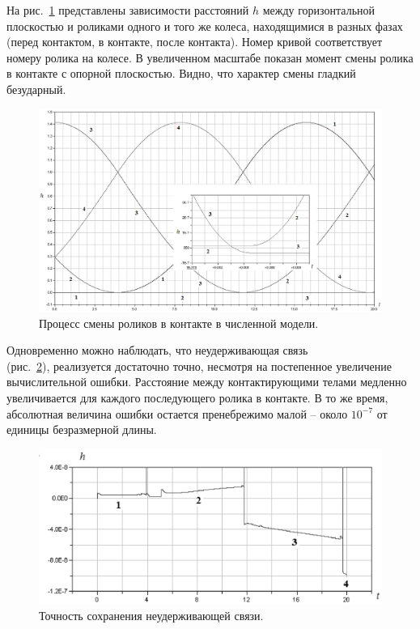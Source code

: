 
На рис.~\ref{fig1} представлены зависимости расстояний $h$ между горизонтальной плоскостью и роликами одного и того же колеса, находящимися в разных фазах (перед контактом, в контакте, после контакта). Номер кривой соответствует номеру ролика на колесе. В увеличенном масштабе показан момент смены ролика в контакте с опорной плоскостью. Видно, что характер смены гладкий безударный.

\begin{figure}[htb]
    \centerline{\includegraphics[width=15cm]{content/parts/3_friction/nd/Figure11.eps}}
    \caption{Процесс смены роликов в контакте в численной модели.}
    \label{fig1}
\end{figure}

Одновременно можно наблюдать, что неудерживающая связь \\ (рис.~\ref{fig:precis}), реализуется достаточно точно, несмотря на постепенное увеличение вычислительной ошибки. Расстояние между контактирующими телами медленно увеличивается для каждого последующего ролика в контакте. В то же время, абсолютная величина ошибки остается пренебрежимо малой -- около $10^{-7}$ от единицы безразмерной длины. 

\begin{figure}[htb]
    \centerline{\includegraphics[width=15cm]{content/parts/3_friction/nd/Figure21.eps}}
    \caption{Точность сохранения неудерживающей связи.}
    \label{fig:precis}
\end{figure}

